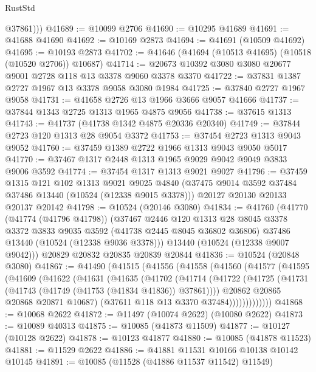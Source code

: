 \begin{lexlean}{RustStd}
\begin{coremodule}
          @37861)))
@41689 := @10099 @2706
@41690 := @10295 @41689
@41691 := @41688 @41690
@41692 := @10169 @2873
@41694 := @41691 (@10509 @41692)
@41695 := @10193 @2873
@41702 := @41646 (@41694 (@10513 @41695) (@10518 (@10520 @2706)) @10687)
@41714 := @20673 @10392 @3080 @3080 @20677 @9001 @2728 @118 @13 @3378 @9060 @3378 @3370
@41722 := @37831 @1387 @2727 @1967 @13 @3378 @9058 @3080 @1984
@41725 := @37840 @2727 @1967 @9058
@41731 := @41658 @2726 @13 @1966 @3666 @9057 @41666
@41737 := @37844 @1343 @2725 @1313 @1965 @4875 @9056
@41738 := @37615 @1313
@41743 := @41737 (@41738 @1342 @4875 @20336 @20340)
@41749 := @37844 @2723 @120 @1313 @28 @9054 @3372
@41753 := @37454 @2723 @1313 @9043 @9052
@41760 := @37459 @1389 @2722 @1966 @1313 @9043 @9050 @5017
@41770 := @37467 @1317 @2448 @1313 @1965 @9029 @9042 @9049 @3833 @9006 @3592
@41774 := @37454 @1317 @1313 @9021 @9027
@41796 := @37459
    @1315
    @121
    @102
    @1313
    @9021
    @9025
    @4840
    (@37475 @9014 @3592 @37484 @37486 @13440 (@10524 (@12338 @9015 @3378)))
    @20127
    @20130
    @20133
    @20137
    @20142
@41798 := @10524 (@20146 @3080)
@41834 := @41760
    (@41770
      (@41774 (@41796 @41798))
      (@37467
        @2446
        @120
        @1313
        @28
        @8045
        @3378
        @3372
        @3833
        @9035
        @3592
        (@41738 @2445 @8045 @36802 @36806)
        @37486
        @13440
        (@10524 (@12338 @9036 @3378)))
      @13440
      (@10524 (@12338 @9007 @9042)))
    @20829
    @20832
    @20835
    @20839
    @20844
@41836 := @10524 (@20848 @3080)
@41867 := @41490
    (@41515
      (@41556
        (@41558
          (@41560
            (@41577
              (@41595
                (@41609
                  (@41622
                    (@41631
                      (@41635
                        (@41702
                          (@41714
                            (@41722
                              (@41725 (@41731 (@41743 (@41749 (@41753 (@41834 @41836)) @37861))))
                              @20862
                              @20865
                              @20868
                              @20871
                              @10687)
                            (@37611 @118 @13 @3370 @37484)))))))))))))
@41868 := @10068 @2622
@41872 := @11497 (@10074 @2622) (@10080 @2622)
@41873 := @10089 @40313
@41875 := @10085 (@41873 @11509)
@41877 := @10127 (@10128 @2622)
@41878 := @10123 @41877
@41880 := @10085 (@41878 @11523)
@41881 := @11529 @2622
@41886 := @41881 @11531 @10166 @10138 @10142 @10145
@41891 := @10085 (@11528 (@41886 @11537 @11542) @11549)

\end{coremodule}
\end{lexlean}

